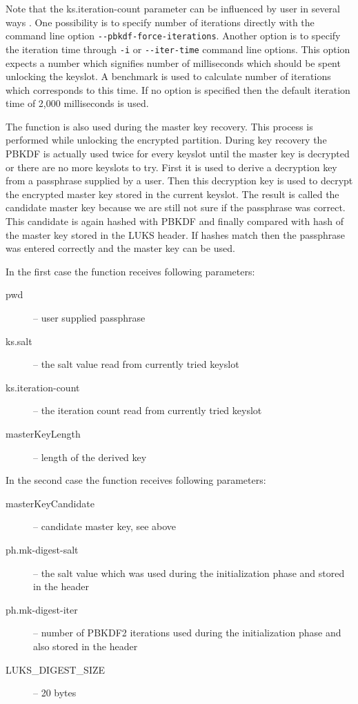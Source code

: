 \documentclass[nolof,digital]{fithesis3}
\begin{document}
Note that the ks.iteration-count parameter can be influenced by user in several ways \parencite{cryptsetupmanual}. One possibility is to specify number of iterations directly with the command line option \verb+--pbkdf-force-iterations+. Another option is to specify the iteration time through \verb+-i+ or \verb+--iter-time+ command line options. This option expects a number which signifies number of milliseconds which should be spent unlocking the keyslot. A benchmark is used to calculate number of iterations which corresponds to this time. If no option is specified then the default iteration time of 2,000 milliseconds is used.

The function is also used during the master key recovery. This process is performed while unlocking the encrypted partition. During key recovery the PBKDF is actually used twice for every keyslot until the master key is decrypted or there are no more keyslots to try. First it is used to derive a decryption key from a passphrase supplied by a user. Then this decryption key is used to decrypt the encrypted master key stored in the current keyslot. The result is called the candidate master key because we are still not sure if the passphrase was correct. This candidate is again hashed with PBKDF and finally compared with hash of the master key stored in the LUKS header. If hashes match then the passphrase was entered correctly and the master key can be used.

In the first case the function receives following parameters:

\begin{description}
\item[pwd] -- user supplied passphrase

\item[ks.salt] -- the salt value read from currently tried keyslot

\item[ks.iteration-count] -- the iteration count read from currently tried keyslot

\item[masterKeyLength] -- length of the derived key
\end{description}

In the second case the function receives following parameters:

\begin{description}
\item[masterKeyCandidate] -- candidate master key, see above

\item[ph.mk-digest-salt] -- the salt value which was used during the initialization phase and stored in the header

\item[ph.mk-digest-iter] -- number of PBKDF2 iterations used during the initialization phase and also stored in the header

\item[LUKS\_DIGEST\_SIZE] -- 20 bytes
\end{description}
\end{document}
